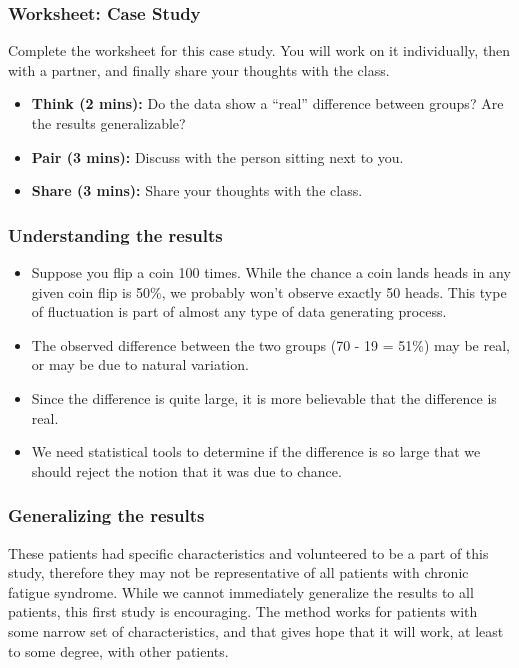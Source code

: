\documentclass[11pt,containsverbatim,handout]{beamer}
\begin{document}
\begin{frame}
	\frametitle{Worksheet: Case Study}
	Complete the worksheet for this case study. You will work on it individually, then with a partner, and finally share your thoughts with the class.
	\begin{itemize}
		\item \textbf{Think (2 mins):} Do the data show a ``real'' difference between groups? Are the results generalizable?
		\item \textbf{Pair (3 mins):} Discuss with the person sitting next to you.
		\item \textbf{Share (3 mins):} Share your thoughts with the class.
	\end{itemize}
\end{frame}

\begin{frame}
\frametitle{Understanding the results}



\begin{itemize}

\item Suppose you flip a coin 100 times. While the chance a coin lands heads in any given coin flip is 50\%, we probably won't observe exactly 50 heads. This type of fluctuation is part of almost any type of data generating process.

\item The observed difference between the two groups (70 - 19 = 51\%) may be real, or may be due to natural variation.

\item Since the difference is quite large, it is more believable that the difference is real.

\item We need statistical tools to determine if the difference is so large that we should reject the notion that it was due to chance.

\end{itemize}

\end{frame}


\begin{frame}
\frametitle{Generalizing the results}



These patients had specific characteristics and volunteered to be a part of this study, therefore they may not be representative of all patients with chronic fatigue syndrome. While we cannot immediately generalize the results to all patients, this first study is encouraging. The method works for patients with some narrow set of characteristics, and that gives hope that it will work, at least to some degree, with other patients.


\end{frame}
\end{document}
